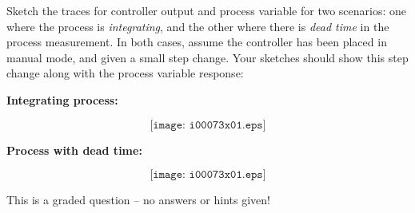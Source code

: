 

Sketch the traces for controller output and process variable for two scenarios: one where the process is {\it integrating}, and the other where there is {\it dead time} in the process measurement.  In both cases, assume the controller has been placed in manual mode, and given a small step change.  Your sketches should show this step change along with the process variable response:

\vskip 10pt

\noindent
{\bf Integrating process:}

$$\texttt{[image: i00073x01.eps]}$$

\vskip 10pt

\noindent
{\bf Process with dead time:}

$$\texttt{[image: i00073x01.eps]}$$

\vfil

\eject






This is a graded question -- no answers or hints given!











